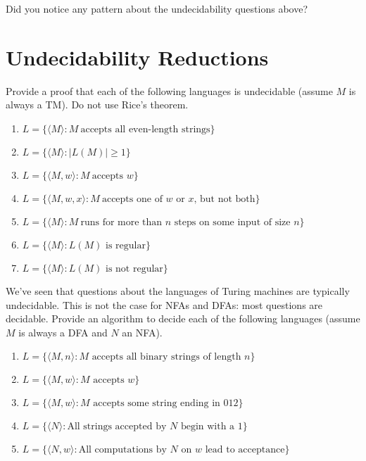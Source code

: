 \documentclass[fleqn]{article}
\begin{document}
\noindent Did you notice any pattern about the undecidability questions above?

\section{Undecidability Reductions}
Provide a proof that each of the following languages is undecidable (assume $M$ is always a TM). Do not use Rice's theorem.
\begin{enumerate}
    \item $L = \{\langle M \rangle : M~\text{accepts all even-length strings}\}$
    \item $L = \{\langle M \rangle : |L(M)| \geq 1 \}$
    \item $L = \{\langle M, w \rangle : M~\text{accepts $w$}\}$
    \item $L = \{\langle M, w, x \rangle : M~\text{accepts one of $w$ or $x$, but not both}\}$
    \item $L = \{\langle M \rangle : M~\text{runs for more than $n$ steps on some input of size $n$}\}$
    \item $L = \{\langle M \rangle : L(M) \text{ is regular}\}$
    \item $L = \{\langle M \rangle : L(M) \text{ is  not regular}\}$
\end{enumerate}

\noindent We've seen that questions about the languages of Turing machines are typically undecidable. This is not the case for NFAs and DFAs: most questions are decidable. Provide an algorithm to decide each of the following languages (assume $M$ is always a DFA and $N$ an NFA).
\begin{enumerate}
    \item $L = \{\langle M, n \rangle : \text{$M$ accepts all binary strings of length $n$}\}$
    \item $L = \{\langle M, w \rangle : \text{$M$ accepts $w$}\}$
    \item $L = \{\langle M, w \rangle : \text{$M$ accepts some string ending in $012$}\}$
    \item $L = \{\langle N \rangle : \text{All strings accepted by $N$ begin with a $1$}\}$
    \item $L = \{\langle N, w \rangle : \text{All computations by $N$ on $w$ lead to acceptance}\}$
\end{enumerate}
\end{document}
